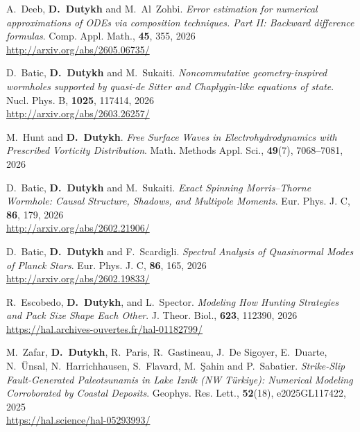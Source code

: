 \begin{etaremune}
  \item A.~Deeb, \textbf{D.~Dutykh} and M.~Al~Zohbi.  \textit{Error estimation for numerical approximations of ODEs via composition techniques. Part II: Backward difference formulas}. Comp. Appl. Math., \textbf{45}, 355, 2026 \\ %
  \url{http://arxiv.org/abs/2605.06735/}
  
  \item D.~Batic, \textbf{D.~Dutykh} and M.~Sukaiti. \textit{Noncommutative geometry-inspired wormholes supported by quasi-de Sitter and Chaplygin-like equations of state}. Nucl. Phys. B, \textbf{1025}, 117414, 2026 \\ %
  \url{http://arxiv.org/abs/2603.26257/}

  \item M.~Hunt and \textbf{D.~Dutykh}. \textit{Free Surface Waves in Electrohydrodynamics with Prescribed Vorticity Distribution}. Math. Methods Appl. Sci., \textbf{49}(7), 7068--7081, 2026 %

  \item D.~Batic, \textbf{D.~Dutykh} and M.~Sukaiti. \textit{Exact Spinning Morris--Thorne Wormhole: Causal Structure, Shadows, and Multipole Moments}. Eur. Phys. J. C, \textbf{86}, 179, 2026 \\ %
  \url{http://arxiv.org/abs/2602.21906/}

  \item D.~Batic, \textbf{D.~Dutykh} and F.~Scardigli. \textit{Spectral Analysis of Quasinormal Modes of Planck Stars}. Eur. Phys. J. C, \textbf{86}, 165, 2026 \\ %
  \url{http://arxiv.org/abs/2602.19833/}

  \item R.~Escobedo, \textbf{D.~Dutykh}, and L.~Spector. \textit{Modeling How Hunting Strategies and Pack Size Shape Each Other}. J. Theor. Biol., \textbf{623}, 112390, 2026 \\ %
  \url{https://hal.archives-ouvertes.fr/hal-01182799/}

  
  
  \item M.~Zafar, \textbf{D.~Dutykh}, R.~Paris, R.~Gastineau, J.~De Sigoyer, E.~Duarte, N.~\"Unsal, N.~Harrichhausen, S.~Flavard, M.~\c{S}ahin and P.~Sabatier. \textit{Strike-Slip Fault-Generated Paleotsunamis in Lake Iznik (NW T\"{u}rkiye): Numerical Modeling Corroborated by Coastal Deposits}. Geophys. Res. Lett., \textbf{52}(18), e2025GL117422, 2025 \\ %
  \url{https://hal.science/hal-05293993/}


\end{etaremune}
